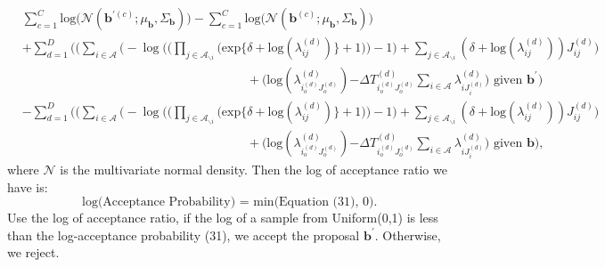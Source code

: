 \documentclass[a4paper]{article}
\begin{document}
   \begin{equation}
   \begin{aligned} 
   &\sum_{c=1}^C\mbox{log}\Big(\mathcal{N}(\boldsymbol{b}^{\prime(c)};\mu_{\boldsymbol{b}}, \Sigma_{\boldsymbol{b}})\Big)-\sum_{c=1}^C\mbox{log}\Big(\mathcal{N}(\boldsymbol{b}^{(c)};\mu_{\boldsymbol{b}}, \Sigma_{\boldsymbol{b}})\Big)\\&+ \sum_{d=1}^D\Bigg(\Big(\sum_{i\in \mathcal{A}}\Big(-\log\Big(\Big(\prod_{j \in \mathcal{A}_{\backslash i}} \Big(\mbox{exp}\{\delta+\mbox{log}(\lambda_{ij}^{(d)})\} + 1\Big)\Big)-1\Big) + \sum_{j \in \mathcal{A}_{\backslash i}} (\delta+\mbox{log}(\lambda_{ij}^{(d)}))J_{ij}^{(d)}\Big)\\&\quad\quad\quad\quad\quad\quad\quad\quad\quad\quad\quad\quad\quad\quad\quad\quad\quad\quad +  \Big(\mbox{log}(\lambda^{(d)}_{i_o^{(d)}J_o^{(d)}}){ - \Delta T^{(d)}_{i_o^{(d)}J_o^{(d)}}\sum\limits_{i \in \mathcal{A}}\lambda^{(d)}_{i{J_i^{(d)}}}} \Big)\mbox{ given }  \boldsymbol{b}^\prime\Bigg)
   \\& -\sum_{d=1}^D\Bigg(\Big(\sum_{i\in \mathcal{A}}\Big(-\log\Big(\Big(\prod_{j \in \mathcal{A}_{\backslash i}} \Big(\mbox{exp}\{\delta+\mbox{log}(\lambda_{ij}^{(d)})\} + 1\Big)\Big)-1\Big) + \sum_{j \in \mathcal{A}_{\backslash i}} (\delta+\mbox{log}(\lambda_{ij}^{(d)}))J_{ij}^{(d)}\Big)\\&\quad\quad\quad\quad\quad\quad\quad\quad\quad\quad\quad\quad\quad\quad\quad\quad\quad\quad +  \Big(\mbox{log}(\lambda^{(d)}_{i_o^{(d)}J_o^{(d)}}){ - \Delta T^{(d)}_{i_o^{(d)}J_o^{(d)}}\sum\limits_{i \in \mathcal{A}}\lambda^{(d)}_{i{J_i^{(d)}}}} \Big)\mbox{ given }  \boldsymbol{b}\Bigg),
   \end{aligned}
   \end{equation}
   where $\mathcal{N}$ is the multivariate normal density. Then the log of acceptance ratio we have is:
   \begin{equation}
   \mbox{log(Acceptance Probability) = min(Equation (31), 0). }
   \end{equation}
   Use the log of acceptance ratio, if the log of a sample from Uniform(0,1) is less than the log-acceptance probability (31), we accept the proposal $\boldsymbol{b}^\prime$. Otherwise, we reject.
\end{document}
